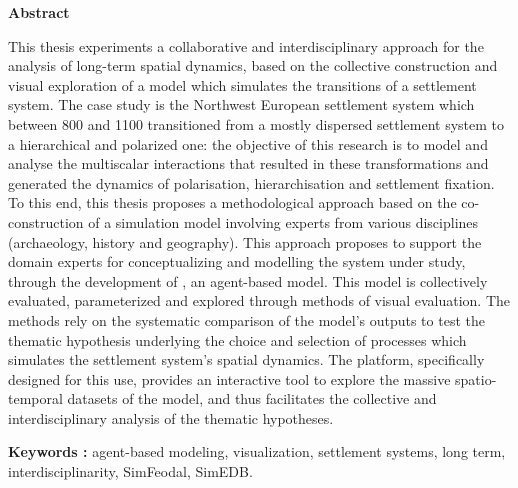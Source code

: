 \textbf{Abstract}

\vspace*{-0.5em}
This thesis experiments a collaborative and interdisciplinary approach for the analysis of long-term spatial dynamics, based on the collective construction and visual exploration of a model which simulates the transitions of a settlement system.
The case study is the Northwest European settlement system which between 800 and 1100 transitioned from a mostly dispersed settlement system to a hierarchical and polarized one: the objective of this research is to model and analyse the multiscalar interactions that resulted in these transformations and generated the dynamics of polarisation, hierarchisation and settlement fixation.\\
To this end, this thesis proposes a methodological approach based on the co-construction of a simulation model involving experts from various disciplines (archaeology, history and geography).
This approach proposes to support the domain experts for conceptualizing and modelling the system under study, through the development of \simfeodal{}, an agent-based model.
This model is collectively evaluated, parameterized and explored through methods of visual evaluation.
The methods rely on the systematic comparison of the model's outputs to test the thematic hypothesis underlying the choice and selection of processes which simulates the settlement system's spatial dynamics.
The \simedb{} platform, specifically designed for this use, provides an interactive tool to explore the massive spatio-temporal datasets of the model, and thus facilitates the collective and interdisciplinary analysis of the thematic hypotheses.

\textbf{Keywords :}
agent-based modeling, visualization, settlement systems, long term, interdisciplinarity, SimFeodal, SimEDB.
